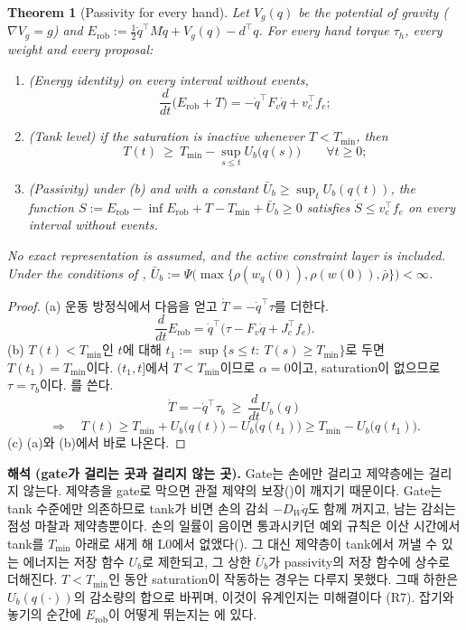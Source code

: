 \documentclass[11pt]{article}\usepackage[margin=1in]{geometry}\usepackage{amsmath,amssymb,amsthm,mathtools}\usepackage{graphicx}\graphicspath{{figures/}{../figures/}{figs/}{./}}\usepackage{enumitem}\usepackage{hyperref}\usepackage{cleveref}\usepackage{tikz}\usetikzlibrary{arrows.meta,positioning,calc,shapes.geometric}\usepackage{float}\usepackage{rotating}\usepackage[most]{tcolorbox}\usepackage{kotex}\usepackage{booktabs}\usepackage{longtable}\emergencystretch=1.6em\tolerance=2000 \crefname{assumption}{Assumption}{Assumptions}\Crefname{assumption}{Assumption}{Assumptions}\crefname{definition}{Definition}{Definitions}\Crefname{definition}{Definition}{Definitions}\crefname{proposition}{Proposition}{Propositions}\Crefname{proposition}{Proposition}{Propositions}\crefname{fact}{Fact}{Facts}\Crefname{fact}{Fact}{Facts} \newtheorem{assumption}{Assumption}\newtheorem{definition}{Definition}\newtheorem{lemma}{Lemma}\newtheorem{proposition}{Proposition}\newtheorem{theorem}{Theorem}\newtheorem{corollary}{Corollary}\newtheorem{fact}{Fact}\theoremstyle{remark}\newtheorem{remark}{Remark} \newcommand{\R}{\mathbb{R}}\newcommand{\xb}{\bar x}\newcommand{\Ab}{\bar A}\newcommand{\By}{\bar B_y}\newcommand{\U}{\mathcal U}\newcommand{\Z}{\mathcal Z}
\begin{document}
\begin{theorem}[Passivity for every hand]
\label{thm:fulltank}
Let $V_g(q)$ be the potential of gravity ($\nabla V_g=g$) and $E_{\mathrm{rob}}:=\tfrac12\dot q^\top M\dot q+V_g(q)-d^\top q$. For every hand torque $\tau_h$, every weight and every proposal:
\begin{enumerate}[label=(\alph*)]
\item (Energy identity) on every interval without events,
\[
\frac{d}{dt}\big(E_{\mathrm{rob}}+T\big)=-\dot q^\top F_v\dot q+v_c^\top f_e ;
\]
\item (Tank level) if the saturation is inactive whenever $T<T_{\min}$, then
\[
T(t)\ \ge\ T_{\min}-\sup_{s\le t}U_b\big(q(s)\big)\qquad\forall t\ge0 ;
\]
\item (Passivity) under (b) and with a constant $\bar U_b\ge\sup_tU_b(q(t))$, the function $S:=E_{\mathrm{rob}}-\inf E_{\mathrm{rob}}+T-T_{\min}+\bar U_b\ge0$ satisfies $\dot S\le v_c^\top f_e$ on every interval without events.
\end{enumerate}
No exact representation is assumed, and the active constraint layer is included. Under the conditions of , $\bar U_b:=\Psi\big(\max\{\rho(w_q(0)),\rho(w(0)),\bar\rho\}\big)<\infty$.
\end{theorem}

\begin{proof}
(a) 운동 방정식에서 다음을 얻고 $\dot T=-\dot q^\top\tau$를 더한다.
\[
\frac{d}{dt}E_{\mathrm{rob}}=\dot q^\top\big(\tau-F_v\dot q+J_c^\top f_e\big) .
\]
(b) $T(t)<T_{\min}$인 $t$에 대해 $t_1:=\sup\{s\le t:\ T(s)\ge T_{\min}\}$로 두면 $T(t_1)=T_{\min}$이다. $(t_1,t]$에서 $T<T_{\min}$이므로 $\alpha=0$이고, saturation이 없으므로 $\tau=\tau_b$이다. 를 쓴다.
\[
\dot T=-\dot q^\top\tau_b\ \ge\ \frac{d}{dt}U_b(q)
\]
\[
\Longrightarrow\quad T(t)\ge T_{\min}+U_b\big(q(t)\big)-U_b\big(q(t_1)\big)\ge T_{\min}-U_b\big(q(t_1)\big) .
\]
(c) (a)와 (b)에서 바로 나온다.
\end{proof}

\textbf{해석 (gate가 걸리는 곳과 걸리지 않는 곳).} Gate는 손에만 걸리고 제약층에는 걸리지 않는다. 제약층을 gate로 막으면 관절 제약의 보장()이 깨지기 때문이다. Gate는 tank 수준에만 의존하므로 tank가 비면 손의 감쇠 $-D_W\dot q$도 함께 꺼지고, 남는 감쇠는 점성 마찰과 제약층뿐이다. 손의 일률이 음이면 통과시키던 예외 규칙은 이산 시간에서 tank를 $T_{\min}$ 아래로 새게 해 L0에서 없앴다(). 그 대신 제약층이 tank에서 꺼낼 수 있는 에너지는 저장 함수 $U_b$로 제한되고, 그 상한 $\bar U_b$가 passivity의 저장 함수에 상수로 더해진다. $T<T_{\min}$인 동안 saturation이 작동하는 경우는 다루지 못했다. 그때 하한은 $U_b(q(\cdot))$의 감소량의 합으로 바뀌며, 이것이 유계인지는 미해결이다 (R7). 잡기와 놓기의 순간에 $E_{\mathrm{rob}}$이 어떻게 뛰는지는 에 있다.
\end{document}
